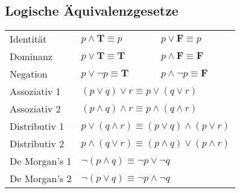 \subsection{Logische Äquivalenzgesetze}
\begin{tabular}{lll}
	Identität & $p \wedge \textbf{T} \equiv p$ & $p \vee \textbf{F} \equiv p$ \\
	Dominanz & $p \vee \textbf{T} \equiv \textbf{T}$ & $p \wedge \textbf{F} \equiv \textbf{F}$ \\
	Negation & $p \vee \neg p \equiv \textbf{T}$ & $p \wedge \neg p \equiv \textbf{F}$ \\
	Assoziativ 1 & \multicolumn{2}{l}{$(p \vee q) \vee r \equiv p \vee (q \vee r)$} \\ 
	Assoziativ 2 & \multicolumn{2}{l}{$(p \wedge q) \wedge r \equiv p \wedge (q \wedge r)$} \\ 
	Distributiv 1 & \multicolumn{2}{l}{$p \vee (q \wedge r) \equiv (p \vee q) \wedge (p \vee r)$} \\ 
	Distributiv 2 & \multicolumn{2}{l}{$p \wedge (q \vee r) \equiv (p \wedge q) \vee (p \wedge r)$} \\ 
	De Morgan’s 1 &
	\multicolumn{2}{l}{$\neg (p \wedge q) \equiv \neg p \vee \neg q$} \\ 
	De Morgan’s 2 & 
	\multicolumn{2}{l}{$\neg (p \vee q) \equiv \neg p \wedge \neg q$} \\ 
\end{tabular} 

